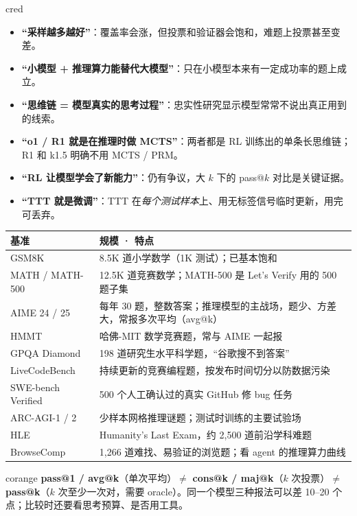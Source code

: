 \documentclass[8pt]{extarticle}
\newcommand{\sect}[2][cred]{\par\vspace{4pt}{\color{#1}\rule[-2pt]{2.5pt}{10pt}}\hspace{3pt}{\large\bfseries\color{#1}#2}\par\nopagebreak\vspace{1pt}}
\begin{document}
\begin{multicols}{4}
\sect[cteal]{15. 常见误区}
\begin{tbox}[title=容易说错的几句话]{cred}\small
\begin{itemize}
\item \textbf{“采样越多越好”}：覆盖率会涨，但投票和验证器会饱和，难题上投票甚至变差。
\item \textbf{“小模型 + 推理算力能替代大模型”}：只在小模型本来有一定成功率的题上成立。
\item \textbf{“思维链 = 模型真实的思考过程”}：忠实性研究显示模型常常不说出真正用到的线索。
\item \textbf{“o1 / R1 就是在推理时做 MCTS”}：两者都是 RL 训练出的单条长思维链；R1 和 k1.5 明确不用 MCTS / PRM。
\item \textbf{“RL 让模型学会了新能力”}：仍有争议，大 $k$ 下的 pass@$k$ 对比是关键证据。
\item \textbf{“TTT 就是微调”}：TTT 在\emph{每个测试样本}上、用无标签信号临时更新，用完可丢弃。
\end{itemize}
\end{tbox}

\sect[cteal]{16. 常用评测基准}
{\small
\begin{tabularx}{\linewidth}{@{}>{\raggedright\arraybackslash\scriptsize}p{1.85cm} Y@{}}
\toprule
基准 & 规模 · 特点\\\midrule
GSM8K & 8.5K 道小学数学（1K 测试）；已基本饱和\\
MATH / MATH-500 & 12.5K 道竞赛数学；MATH-500 是 Let's Verify 用的 500 题子集\\
AIME 24 / 25 & 每年 30 题，整数答案；推理模型的主战场，题少、方差大，常报多次平均（avg@k）\\
HMMT & 哈佛-MIT 数学竞赛题，常与 AIME 一起报\\
GPQA Diamond & 198 道研究生水平科学题，“谷歌搜不到答案”\\
LiveCodeBench & 持续更新的竞赛编程题，按发布时间切分以防数据污染\\
SWE-bench Verified & 500 个人工确认过的真实 GitHub 修 bug 任务\\
ARC-AGI-1 / 2 & 少样本网格推理谜题；测试时训练的主要试验场\\
HLE & Humanity's Last Exam，约 2,500 道前沿学科难题\\
BrowseComp & 1,266 道难找、易验证的浏览题；看 agent 的推理算力曲线\\
\bottomrule
\end{tabularx}}
\begin{tbox}[title=读数字时注意]{corange}\small
\textbf{pass@1 / avg@k}（单次平均）$\ne$ \textbf{cons@k / maj@k}（$k$ 次投票）$\ne$ \textbf{pass@k}（$k$ 次至少一次对，需要 oracle）。同一个模型三种报法可以差 10–20 个点；比较时还要看思考预算、是否用工具。
\end{tbox}
\end{multicols}
\end{document}
